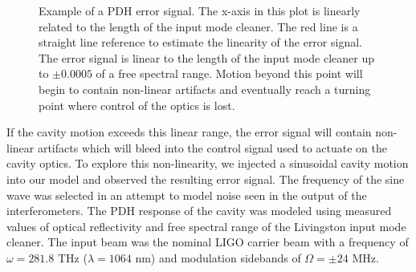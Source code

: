 \begin{figure}[h!]
\centering

\caption[Example of a PDH error signal]{Example of a PDH error signal. %
         The x-axis in this plot is linearly related to the length of the %
         input mode cleaner. 
         The red line is a straight line reference to estimate the linearity %
         of the error signal. %
         The error signal is linear to the length of the %
         input mode cleaner up to $\pm0.0005$ of a free spectral range. Motion %
         beyond this point will begin to contain non-linear artifacts and %
         eventually reach a turning point where control of the optics is lost.}
\label{fig:pdh}
\end{figure}

If the cavity motion exceeds this linear range, the error signal will 
contain non-linear artifacts which will bleed into the control signal 
used to actuate on the cavity optics.
To explore this non-linearity, we injected a sinusoidal cavity motion into our 
model and observed the resulting error signal.
The frequency of the sine wave was selected in an attempt to model 
noise seen in the output of the interferometers.  
The PDH response of the cavity was modeled using measured values of optical 
reflectivity and free spectral range of the Livingston input mode cleaner. 
The input beam was the nominal LIGO carrier beam with a frequency of 
$\omega = 281.8$ THz ($\lambda = 1064$ nm) and modulation sidebands of 
$\Omega = \pm24$ MHz.

